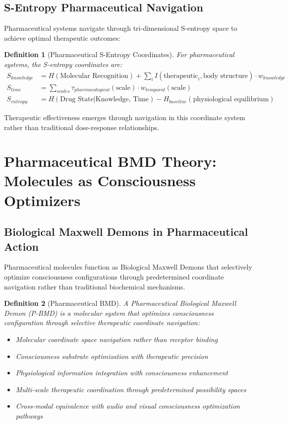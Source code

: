 \documentclass[12pt,a4paper]{article}
\newtheorem{definition}{Definition}
\begin{document}
\subsection{S-Entropy Pharmaceutical Navigation}

Pharmaceutical systems navigate through tri-dimensional S-entropy space to achieve optimal therapeutic outcomes:

\begin{definition}[Pharmaceutical S-Entropy Coordinates]
For pharmaceutical systems, the S-entropy coordinates are:
\begin{align}
S_{knowledge} &= H(\text{Molecular Recognition}) + \sum_i I(\text{therapeutic}_i, \text{body structure}) \cdot w_{knowledge} \\
S_{time} &= \sum_{scales} \tau_{pharmacological}(\text{scale}) \cdot w_{temporal}(\text{scale}) \\
S_{entropy} &= H(\text{Drug State}|\text{Knowledge, Time}) - H_{baseline}(\text{physiological equilibrium})
\end{align}
\end{definition}

Therapeutic effectiveness emerges through navigation in this coordinate system rather than traditional dose-response relationships.

\section{Pharmaceutical BMD Theory: Molecules as Consciousness Optimizers}

\subsection{Biological Maxwell Demons in Pharmaceutical Action}

Pharmaceutical molecules function as Biological Maxwell Demons that selectively optimize consciousness configurations through predetermined coordinate navigation rather than traditional biochemical mechanisms.

\begin{definition}[Pharmaceutical BMD]
A Pharmaceutical Biological Maxwell Demon (P-BMD) is a molecular system that optimizes consciousness configuration through selective therapeutic coordinate navigation:
\begin{itemize}
\item Molecular coordinate space navigation rather than receptor binding
\item Consciousness substrate optimization with therapeutic precision
\item Physiological information integration with consciousness enhancement
\item Multi-scale therapeutic coordination through predetermined possibility spaces
\item Cross-modal equivalence with audio and visual consciousness optimization pathways
\end{itemize}
\end{definition}
\end{document}
